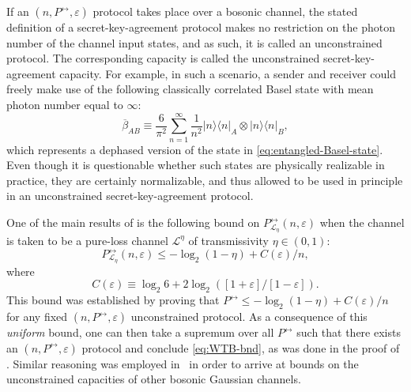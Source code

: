 \documentclass[apsrev,twocolumn]{revtex4-1}%
\begin{document}
If an $(n,P^{\leftrightarrow},\varepsilon)$ protocol takes place over a
bosonic channel, the stated definition of a secret-key-agreement protocol
makes no restriction on the photon number of the channel input states, and as
such, it is called an unconstrained protocol. The corresponding capacity is
called the unconstrained secret-key-agreement capacity. For example, in such a
scenario, a sender and receiver could freely make use of the following
classically correlated Basel state with mean photon number equal to $\infty$:%
\begin{equation}
\overline{\beta}_{AB}\equiv\frac{6}{\pi^{2}}\sum_{n=1}^{\infty}\frac{1}{n^{2}%
}|n\rangle\langle n|_{A}\otimes|n\rangle\langle n|_{B} ,
\label{eq:basel-state-sep}%
\end{equation}
which represents a dephased version of the state in
\eqref{eq:entangled-Basel-state}. Even though it is questionable whether such
states are physically realizable in practice, they are certainly normalizable,
and thus allowed to be used in principle in an unconstrained
secret-key-agreement protocol.

One of the main results of \cite{WTB16} is the following bound on
$P_{\mathcal{L}_{\eta}}^{\leftrightarrow}(n,\varepsilon)$ when the channel is
taken to be a pure-loss channel $\mathcal{L}^{\eta}$ of transmissivity
$\eta\in(0,1)$:%
\begin{equation}
P_{\mathcal{L}_{\eta}}^{\leftrightarrow}(n,\varepsilon)\leq-\log_{2}%
(1-\eta)+C(\varepsilon)/n, \label{eq:WTB-bnd}%
\end{equation}
where%
\begin{equation}
C(\varepsilon)\equiv\log_{2}6+2\log_{2}(\left[  1+\varepsilon\right]  /\left[
1-\varepsilon\right]  ).
\end{equation}
This bound was established by proving that $P^{\leftrightarrow}\leq-\log
_{2}(1-\eta)+C(\varepsilon)/n$ for any fixed $(n,P^{\leftrightarrow
},\varepsilon)$ unconstrained protocol. As a consequence of this
\textit{uniform} bound, one can then take a supremum over all
$P^{\leftrightarrow}$ such that there exists an $(n,P^{\leftrightarrow
},\varepsilon)$ protocol and conclude \eqref{eq:WTB-bnd}, as was done in the
proof of \cite[Theorem~24]{WTB16}. Similar reasoning was employed in
\cite{WTB16}\ in order to arrive at bounds on the unconstrained capacities of
other bosonic Gaussian channels.
\end{document}
